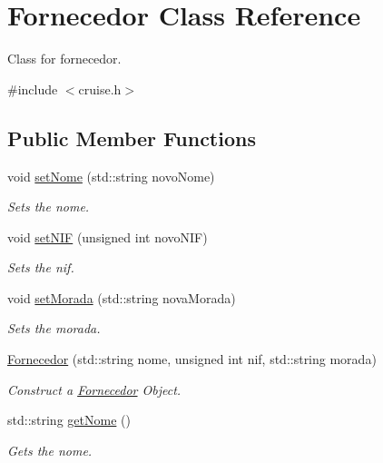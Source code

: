 \hypertarget{classFornecedor}{}\section{Fornecedor Class Reference}
\label{classFornecedor}


Class for fornecedor.  




{\ttfamily \#include $<$cruise.\+h$>$}

\subsection*{Public Member Functions}
\begin{DoxyCompactItemize}
\item 
void \hyperlink{classFornecedor_a2f207b2242cf6ec5d76a3808dbb4fd80}{set\+Nome} (std\+::string novo\+Nome)
\begin{DoxyCompactList}\small\item\em Sets the nome. \end{DoxyCompactList}\item 
void \hyperlink{classFornecedor_a9bbb88ef7aa281df4042aeedadcd510e}{set\+N\+IF} (unsigned int novo\+N\+IF)
\begin{DoxyCompactList}\small\item\em Sets the nif. \end{DoxyCompactList}\item 
void \hyperlink{classFornecedor_a240f4abc6ac49f030c93679b3628e222}{set\+Morada} (std\+::string nova\+Morada)
\begin{DoxyCompactList}\small\item\em Sets the morada. \end{DoxyCompactList}\item 
\hyperlink{classFornecedor_a0cbc4556289cc946756039ab0da52756}{Fornecedor} (std\+::string nome, unsigned int nif, std\+::string morada)
\begin{DoxyCompactList}\small\item\em Construct a \hyperlink{classFornecedor}{Fornecedor} Object. \end{DoxyCompactList}\item 
std\+::string \hyperlink{classFornecedor_a8d14dd862259e29adef0e283f15cbb16}{get\+Nome} ()
\begin{DoxyCompactList}\small\item\em Gets the nome. \end{DoxyCompactList}\item 

\end{DoxyCompactItemize}
